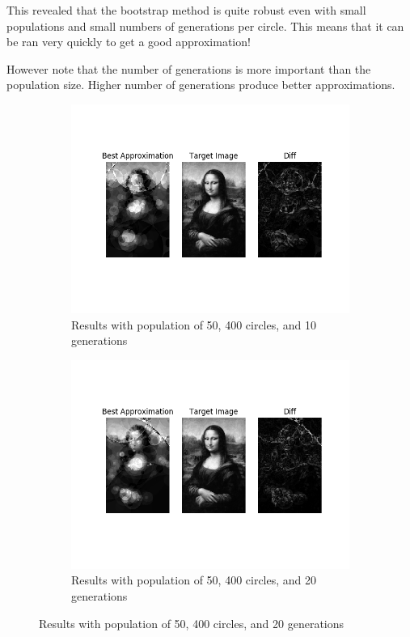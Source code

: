 \documentclass{article}
\begin{document}
This revealed that the bootstrap method is quite robust even with small populations and small numbers of generations per circle. This means that it can be ran very quickly to get a good approximation!

However note that the number of generations is more important than the population size. Higher number of generations produce better approximations.

\begin{figure}[H]
    \centering
    \begin{subfigure}[b]{0.45\textwidth}
        \centering
        \includegraphics[width=\textwidth]{output/bs-p50c400g10.png}
        \caption{Results with population of 50, 400 circles, and 10 generations}
    \end{subfigure}
    \begin{subfigure}[b]{0.45\textwidth}
        \centering
        \includegraphics[width=\textwidth]{output/bs-p50c400g20.png}
        \caption{Results with population of 50, 400 circles, and 20 generations}
    \end{subfigure}
\end{figure}
\end{document}
